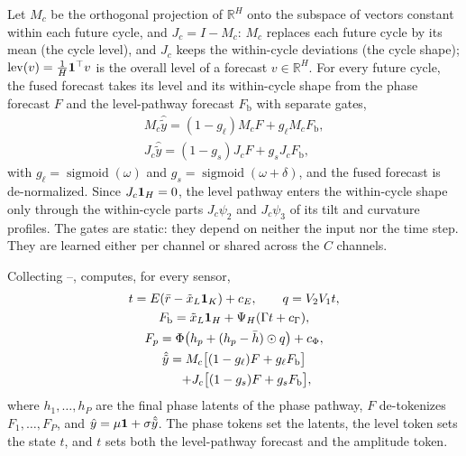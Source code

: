 {
Let $M_c$ be the orthogonal projection of $\mathbb R^H$ onto the subspace of vectors constant within each future cycle, and $J_c=I-M_c$: $M_c$ replaces each future cycle by its mean (the cycle level), and $J_c$ keeps the within-cycle deviations (the cycle shape); $\operatorname{lev}(v)=\tfrac1H\mathbf 1^\top v$ is the overall level of a forecast $v\in\mathbb R^H$. For every future cycle, the fused forecast takes its level and its within-cycle shape from the phase forecast $F$ and the level-pathway forecast $F_{\mathrm b}$ with separate gates,
\begin{equation}
\begin{gathered}
M_c\hat{\tilde y}=(1-g_\ell)M_cF+g_\ell M_cF_{\mathrm b},\\
J_c\hat{\tilde y}=(1-g_s)J_cF+g_sJ_cF_{\mathrm b},
\end{gathered}
\label{eq:fusion}
\end{equation}
with $g_\ell=\operatorname{sigmoid}(\omega)$ and $g_s=\operatorname{sigmoid}(\omega+\delta)$, and the fused forecast is de-normalized. Since $J_c\mathbf 1_H=0$, the level pathway enters the within-cycle shape only through the within-cycle parts $J_c\psi_2$ and $J_c\psi_3$ of its tilt and curvature profiles. The gates are static: they depend on neither the input nor the time step. They are learned either per channel or shared across the $C$ channels.

Collecting --, \sysplus computes, for every sensor,
\begin{equation}
\begin{gathered}
t=E(\bar r-\tilde x_L\mathbf 1_K)+c_E,\qquad q=V_2V_1t,\\
F_{\mathrm b}=\tilde x_L\mathbf 1_H+\Psi_H(\Gamma t+c_\Gamma),\\
F_p=\Phi\big(h_p+(h_p-\bar h)\odot q\big)+c_\Phi,\\
\hat{\tilde y}=M_c\big[(1-g_\ell)F+g_\ell F_{\mathrm b}\big]\\
\qquad+J_c\big[(1-g_s)F+g_sF_{\mathrm b}\big],
\end{gathered}
\label{eq:forward}
\end{equation}
where $h_1,\dots,h_P$ are the final phase latents of the phase pathway, $F$ de-tokenizes $F_1,\dots,F_P$, and $\hat y=\mu\mathbf 1+\sigma\hat{\tilde y}$. The phase tokens set the latents, the level token sets the state $t$, and $t$ sets both the level-pathway forecast and the amplitude token.

}
